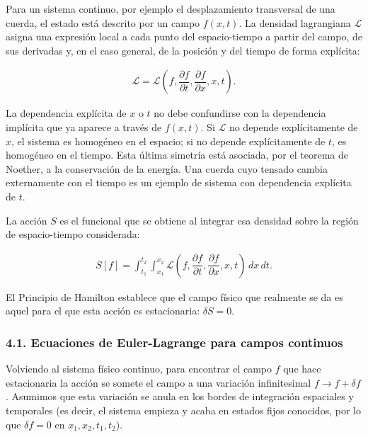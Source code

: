 \documentclass[
  spanish,
]{article}
\begin{document}
Para un sistema continuo, por ejemplo el desplazamiento transversal de
una cuerda, el estado está descrito por un campo \(f(x,t)\). La densidad
lagrangiana \(\mathcal{L}\) asigna una expresión local a cada punto del
espacio-tiempo a partir del campo, de sus derivadas y, en el caso
general, de la posición y del tiempo de forma explícita:

\[
\begin{aligned}
\mathcal{L}
= \mathcal{L}\left(
f,
\dfrac{\partial f}{\partial t},
\dfrac{\partial f}{\partial x},
x,t
\right).
\end{aligned}
\]

La dependencia explícita de \(x\) o \(t\) no debe confundirse con la
dependencia implícita que ya aparece a través de \(f(x,t)\). Si
\(\mathcal{L}\) no depende explícitamente de \(x\), el sistema es
homogéneo en el espacio; si no depende explícitamente de \(t\), es
homogéneo en el tiempo. Esta última simetría está asociada, por el
teorema de Noether, a la conservación de la energía. Una cuerda cuyo
tensado cambia externamente con el tiempo es un ejemplo de sistema con
dependencia explícita de \(t\).

La acción \(S\) es el funcional que se obtiene al integrar esa densidad
sobre la región de espacio-tiempo considerada:

\[
\begin{aligned}
S[f]
= \int_{t_1}^{t_2} \int_{x_1}^{x_2}
\mathcal{L}\left(
f,
\dfrac{\partial f}{\partial t},
\dfrac{\partial f}{\partial x},
x,t
\right) \, dx \, dt.
\end{aligned}
\]

El Principio de Hamilton establece que el campo físico que realmente se
da es aquel para el que esta acción es estacionaria: \(\delta S = 0\).

\subsubsection{4.1. Ecuaciones de Euler-Lagrange para campos
continuos}\label{ecuaciones-de-euler-lagrange-para-campos-continuos}

Volviendo al sistema físico continuo, para encontrar el campo \(f\) que
hace estacionaria la acción se somete el campo a una variación
infinitesimal \(f \rightarrow f + \delta f\). Asumimos que esta
variación se anula en los bordes de integración espaciales y temporales
(es decir, el sistema empieza y acaba en estados fijos conocidos, por lo
que \(\delta f = 0\) en \(x_1, x_2, t_1, t_2\)).
\end{document}
